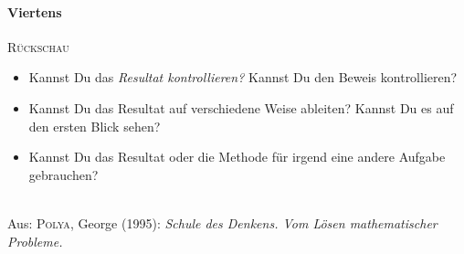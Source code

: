 \documentclass
[
  fontsize = 11pt,
  parskip  = half-,
  BCOR     = 0pt,
  DIV      = 11,
  draft,
  ngerman
]
{scrartcl}
\begin{document}
\paragraph{Viertens}\textsc{Rückschau}
\begin{itemize}
  \renewcommand{\itemsep}{-0.5ex}
  \item Kannst Du das \textit{Resultat kontrollieren?} Kannst Du den Beweis kontrollieren?
  \item Kannst Du das Resultat auf verschiedene Weise ableiten? Kannst Du es auf den ersten
        Blick sehen?
  \item Kannst Du das Resultat oder die Methode für irgend eine andere Aufgabe gebrauchen?
\end{itemize}

\hrulefill\\
Aus: \textsc{Polya}, George (1995): \textit{Schule des Denkens. Vom Lösen mathematischer Probleme.}

\end{document}
